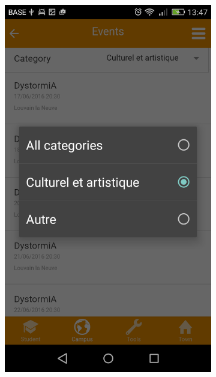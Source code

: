 \documentclass{eplmastersthesis}
\begin{document}
\begin{figure}
\begin{subfigure}[b]{0.3\textwidth}
        \includegraphics[width=\textwidth]{Images/Application_screens/Screenshot_2016-06-06-13-47-47.png}
    \end{subfigure}
\end{figure}
\end{document}
